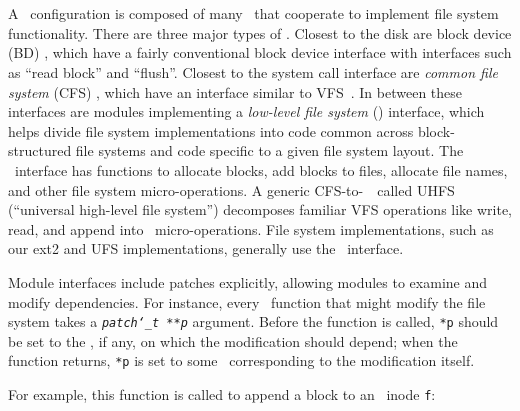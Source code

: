 
\section{\Modules}
\label{sec:modules}

A \Kudos\ configuration is composed of many \modules\ that cooperate to
 implement file system functionality.
%
There are three major types of \modules.
%
Closest to the disk are block device (BD) \modules, which have a fairly
conventional block device interface with interfaces such as ``read block'' and
``flush''. 
%
Closest to the system call interface are \emph{common file system} (CFS)
\modules, which have an interface similar to VFS~\cite{kleiman86vnodes}. 
%
In between these interfaces are modules implementing a  \emph{low-level file
system} (\LFS) interface, which helps divide file system implementations
into code common across block-structured file systems and code specific to
a given file system layout.
%
The \LFS\ interface has functions to allocate blocks, add blocks to files,
allocate file names, and other file system micro-operations. 
A generic CFS-to-\LFS\ \module\ called UHFS
(``universal high-level file system'') decomposes familiar VFS operations
like write, read, and append into \LFS\ micro-operations. 
%
%
File system implementations, such as our ext2 and UFS implementations,
generally use the \LFS\ interface.


Module interfaces include patches explicitly, allowing modules to examine
and modify dependencies.
%
For instance, every \LFS\ function that might modify the file system takes a
\texttt{\textit{patch\char`\_t **p}} argument.
%
Before the function is called, \texttt{*p} should be set to the \patch,
if any, on which the modification should depend;
%
when the function returns, \texttt{*p} is set to some \patch\
corresponding to the modification itself.
%
\begin{comment}
(\Noop\ \patches\ allow this interface to generalize to multiple
dependencies.)
\end{comment}
%
For example, this function is called to append a block to an \LFS\ inode
\verb+f+:

